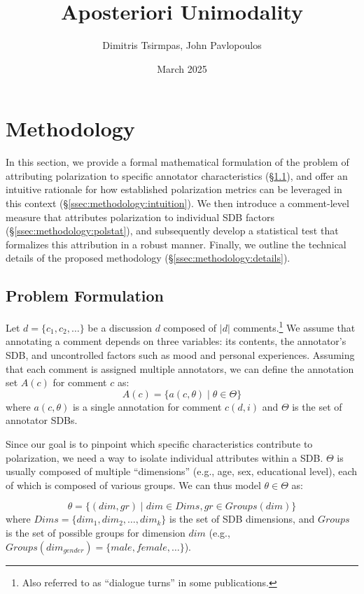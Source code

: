 \documentclass{article}
\title{Aposteriori Unimodality}
\author{Dimitris Tsirmpas, John Pavlopoulos}
\date{March 2025}
\newcommand{\sdbdim}{\textit{dim}}
\newcommand{\Sdbdim}{\textit{Dims}}
\newcommand{\sdbgroup}{\textit{gr}}
\newcommand{\Sdbgroup}{\textit{Groups}}
\begin{document}
\maketitle

\section{Methodology}

In this section, we provide a formal mathematical formulation of the problem of attributing polarization to specific annotator characteristics (\S\ref{ssec:methodology:problem}), and offer an intuitive rationale for how established polarization metrics can be leveraged in this context (\S\ref{ssec:methodology:intuition}). We then introduce a comment-level measure that attributes polarization to individual \ac{SDB} factors (\S\ref{ssec:methodology:polstat}), and subsequently develop a statistical test that formalizes this attribution in a robust manner. Finally, we outline the technical details of the proposed methodology (\S\ref{ssec:methodology:details}).

\subsection{Problem Formulation}
\label{ssec:methodology:problem}

Let $d = \{c_1, c_2, \ldots\}$ be a discussion $d$ composed of $\lvert d \rvert$ comments.\footnote{Also referred to as “dialogue turns” in some publications.} We assume that annotating a comment depends on three variables: its contents, the annotator's \ac{SDB}, and uncontrolled factors such as mood and personal experiences. Assuming that each comment is assigned multiple annotators, we can define the annotation set $A(c)$ for comment $c$ as:
\begin{equation}
    A(c) = \{a(c, \theta) \mid \theta \in \Theta \}
\end{equation}
\noindent where  $a(c, \theta)$ is a single annotation for comment $c(d,i)$ and $\Theta$ is the set of annotator \acp{SDB}.

Since our goal is to pinpoint which specific characteristics contribute to polarization, we need a way to isolate individual attributes within a \ac{SDB}. $\Theta$ is usually composed of multiple ``dimensions'' (e.g., age, sex, educational level), each of which is composed of various groups. We can thus model $\theta \in \Theta$ as:

\begin{equation}
    \theta = \{(\sdbdim, \sdbgroup) \mid \sdbdim \in \Sdbdim, \sdbgroup \in \Sdbgroup(\sdbdim)\}
\end{equation} 
\noindent where $\Sdbdim =\{\sdbdim_1, \sdbdim_2, \ldots, \sdbdim_k\}$ is the set of \ac{SDB} dimensions, and $\Sdbgroup$ is the set of possible groups for dimension $\sdbdim$ (e.g., $\Sdbgroup(\sdbdim_{\textit{gender}}) = \{\textit{male}, \textit{female}, \ldots\}$).
\end{document}
